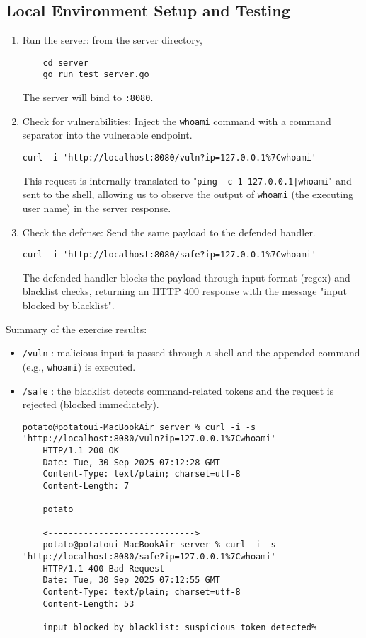 \documentclass{article}
\begin{document}
\subsection{Local Environment Setup and Testing}
\begin{enumerate}
	\item Run the server: from the server directory,
	\begin{lstlisting}
	cd server
	go run test_server.go
	\end{lstlisting}
	The server will bind to \texttt{:8080}.
	\item Check for vulnerabilities: Inject the \texttt{whoami} command with a command separator into the vulnerable endpoint.
	\begin{lstlisting}[caption={Test example for the vulnerable endpoint}]
	curl -i 'http://localhost:8080/vuln?ip=127.0.0.1%7Cwhoami'
	\end{lstlisting}
	This request is internally translated to "\texttt{ping -c 1 127.0.0.1|whoami}" and sent to the shell, allowing us to observe the output of \texttt{whoami} (the executing user name) in the server response.

	\item Check the defense: Send the same payload to the defended handler.
	\begin{lstlisting}[caption={Test example for the defended handler}]
	curl -i 'http://localhost:8080/safe?ip=127.0.0.1%7Cwhoami'
	\end{lstlisting}
	The defended handler blocks the payload through input format (regex) and blacklist checks, returning an HTTP 400 response with the message "input blocked by blacklist".
\end{enumerate}

Summary of the exercise results:
\begin{itemize}
    \item \texttt{/vuln} : malicious input is passed through a shell and the appended command (e.g., \texttt{whoami}) is executed.
    \item \texttt{/safe} : the blacklist detects command-related tokens and the request is rejected (blocked immediately).
    \begin{lstlisting}[caption={Experimental results}, label={lst:result}]
    potato@potatoui-MacBookAir server % curl -i -s 'http://localhost:8080/vuln?ip=127.0.0.1%7Cwhoami'
    HTTP/1.1 200 OK
    Date: Tue, 30 Sep 2025 07:12:28 GMT
    Content-Type: text/plain; charset=utf-8
    Content-Length: 7

    potato

    <----------------------------->
    potato@potatoui-MacBookAir server % curl -i -s 'http://localhost:8080/safe?ip=127.0.0.1%7Cwhoami'
    HTTP/1.1 400 Bad Request
    Date: Tue, 30 Sep 2025 07:12:55 GMT
    Content-Type: text/plain; charset=utf-8
    Content-Length: 53

    input blocked by blacklist: suspicious token detected%  
    \end{lstlisting}
\end{itemize}
\end{document}
